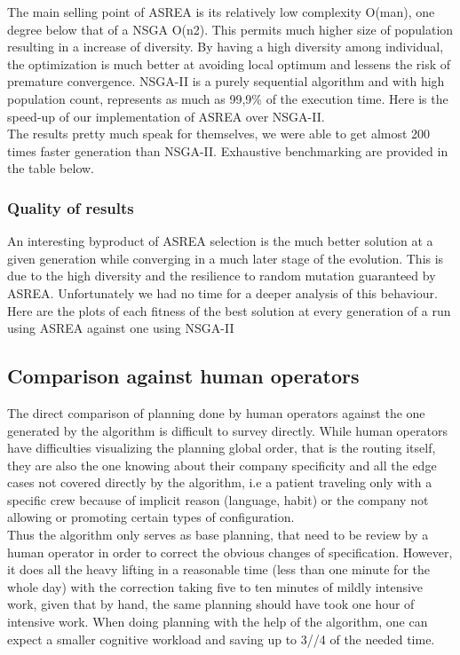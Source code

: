 \documentclass[12pt]{memoir}
\begin{document}
The main selling point of ASREA is its relatively low complexity O(man), one degree below that of a NSGA O(n2).
This permits much higher size of population resulting in a increase of diversity. By having a high diversity
among individual, the optimization is much better at avoiding local optimum and lessens the risk of premature
convergence. NSGA-II is a purely sequential algorithm and with high population count, represents as much as
99,9\% of the execution time. Here is the speed-up of our implementation of ASREA over NSGA-II. \\
The results pretty much speak for themselves, we were able to get almost 200 times faster generation
than NSGA-II. Exhaustive benchmarking are provided in the table below.
 
\subsubsection{Quality of results}
An interesting byproduct of ASREA selection is the much better solution at a given generation while converging
in a much later stage of the evolution. This is due to the high diversity and the resilience to random mutation
guaranteed by ASREA. Unfortunately we had no time for a deeper analysis of this behaviour. Here are the plots of
each fitness of the best solution at every generation of a run using ASREA against one using NSGA-II

\subsection{Comparison against human operators}
The direct comparison of planning done by human operators against the one generated by the algorithm is difficult
to survey directly. While human operators have difficulties visualizing the planning global order, that is the routing
itself, they are also the one knowing about their company specificity and all the edge cases not covered directly by
the algorithm, i.e a patient traveling only with a specific crew because of implicit reason (language, habit) or the company
not allowing or promoting certain types of configuration.\\

\bigskip
Thus the algorithm only serves as base planning, that need to be review by a human operator in order to correct
the obvious changes of specification. However, it does all the heavy lifting in a reasonable time (less than one minute
for the whole day) with the correction taking five to ten minutes of mildly intensive work, given that by hand, the same planning
should have took one hour of intensive work. When doing planning with the help of the algorithm, one can expect a smaller
cognitive workload and saving up to 3//4 of the needed time.  
\end{document}
